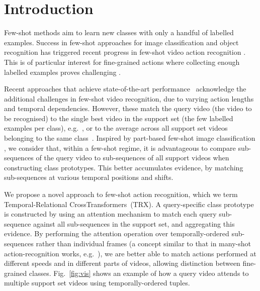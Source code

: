 \documentclass[final]{cvpr}
\begin{document}
\section{Introduction}

Few-shot methods aim to learn new classes with only a handful of labelled examples. 
Success in few-shot approaches for image classification \cite{Finn2017,Requeima2019,Doersch2020} and object recognition \cite{Xu2017,Kang2019} has triggered recent progress in few-shot video action recognition \cite{Zhu2018,Zhu2020,Bishay2019,Zhang2020,Cao2020}. This is of particular interest for fine-grained actions where collecting enough labelled examples proves challenging \cite{Carreira,Goyal2017,Damen2018EPICKITCHENS}.


Recent approaches that achieve state-of-the-art performance~\cite{Bishay2019,Zhang2020,Cao2020} acknowledge the additional challenges in few-shot video recognition, due to varying action lengths and temporal dependencies.
However, these match the query video (\ie the video to be recognised) to the single best video in the support set (\ie the few labelled examples per class), e.g.~\cite{Zhang2020}, or to the average across all support set videos belonging to the same class~\cite{Bishay2019,Cao2020}.  Inspired by part-based few-shot image classification \cite{Doersch2020}, we consider that, within a few-shot regime, it is advantageous to compare sub-sequences of the query video to sub-sequences of all support videos when constructing class prototypes. 
This better accumulates evidence, by matching sub-sequences at various temporal positions and shifts. 
 

We propose a novel approach to few-shot action recognition, which we term Temporal-Relational CrossTransformers~(TRX).  A query-specific class prototype is constructed by 
using an attention mechanism to match each query sub-sequence against all sub-sequences in the support set, and aggregating this evidence.
By performing the attention operation over temporally-ordered sub-sequences rather than individual frames (a concept similar to that in many-shot action-recognition works, e.g.~\cite{Zhou2018, Feichtenhofer2019}), we are better able to match actions performed at different speeds and in different parts of videos, allowing distinction between 
fine-grained classes.  Fig.~\ref{fig:vis} shows an example of how a query video attends to multiple support set videos using temporally-ordered tuples.
\end{document}
